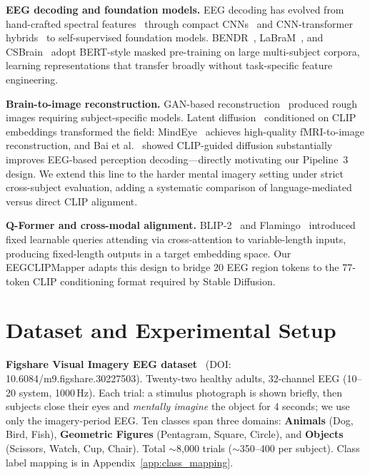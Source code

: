 \documentclass{article}
\begin{document}
\textbf{EEG decoding and foundation models.}
EEG decoding has evolved from hand-crafted spectral features~\citep{blankertz2007bci} through compact CNNs~\citep{lawhern2018eegnet} and CNN-transformer hybrids~\citep{song2023eegconformer} to self-supervised foundation models. BENDR~\citep{kostas2022bendr}, LaBraM~\citep{jiang2024labram}, and CSBrain~\citep{zhu2024csbrain} adopt BERT-style masked pre-training on large multi-subject corpora, learning representations that transfer broadly without task-specific feature engineering.

\textbf{Brain-to-image reconstruction.}
GAN-based reconstruction~\citep{shen2019end,tirupattur2018thoughtviz,kavasidis2017brain2image} produced rough images requiring subject-specific models. Latent diffusion~\citep{rombach2022ldm} conditioned on CLIP~\citep{radford2021clip} embeddings transformed the field: MindEye~\citep{scotti2024mindeye} achieves high-quality fMRI-to-image reconstruction, and Bai et al.~\citep{bai2023brain} showed CLIP-guided diffusion substantially improves EEG-based perception decoding---directly motivating our Pipeline~3 design. We extend this line to the harder mental imagery setting under strict cross-subject evaluation, adding a systematic comparison of language-mediated versus direct CLIP alignment.

\textbf{Q-Former and cross-modal alignment.}
BLIP-2~\citep{li2023blip2} and Flamingo~\citep{alayrac2022flamingo} introduced fixed learnable queries attending via cross-attention to variable-length inputs, producing fixed-length outputs in a target embedding space. Our EEGCLIPMapper adapts this design to bridge 20 EEG region tokens to the 77-token CLIP conditioning format required by Stable Diffusion.

\section{Dataset and Experimental Setup}
\label{sec:dataset}

\textbf{Figshare Visual Imagery EEG dataset}~\citep{figshare_eeg} (DOI: 10.6084/m9.figshare.30227503). Twenty-two healthy adults, 32-channel EEG (10--20 system, 1000\,Hz). Each trial: a stimulus photograph is shown briefly, then subjects close their eyes and \emph{mentally imagine} the object for 4 seconds; we use only the imagery-period EEG. Ten classes span three domains: \textbf{Animals} (Dog, Bird, Fish), \textbf{Geometric Figures} (Pentagram, Square, Circle), and \textbf{Objects} (Scissors, Watch, Cup, Chair). Total $\sim$8,000 trials ($\sim$350--400 per subject). Class label mapping is in Appendix~\ref{app:class_mapping}.
\end{document}
